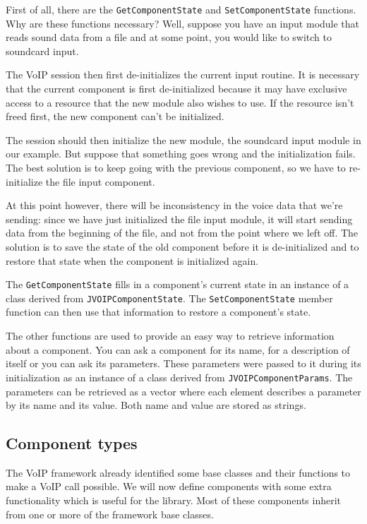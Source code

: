		First of all, there are the {\tt GetComponentState} and {\tt SetComponentState}
		functions. Why are these functions necessary? Well, suppose you have an input
		module that reads sound data from a file and at some point, you would like to switch
		to soundcard input.
		
		The VoIP session then first de-initializes the current input
		routine. It is necessary that the current component is first de-initialized because
		it may have exclusive access to a resource that the new module also wishes to use.
		If the resource isn't freed first, the new component can't be initialized.
		
		The session should then initialize the new module, the soundcard input module in
		our example. But suppose that something goes wrong and the initialization fails.
		The best solution is to keep going with the previous component, so we have to
		re-initialize the file input component.
		
		At this point however, there will be inconsistency in the voice data that we're
		sending: since we have just initialized the file input module, it will start
		sending data from the beginning of the file, and not from the point where we
		left off. The solution is to save the state of the old component before it is
		de-initialized and to restore that state when the component is initialized
		again.
		
		The {\tt GetComponentState} fills in a component's current state in an instance
		of a class derived from {\tt JVOIPComponentState}. The {\tt Set\-Com\-po\-nent\-State}
		member function can then use that information to restore a component's state.
		
		The other functions are used to provide an easy way to retrieve information
		about a component. You can ask a component for its name, for a description of
		itself or you can ask its parameters. These parameters were passed to it
		during its initialization as an instance of a class derived from
		{\tt JVOIP\-Component\-Params}. The parameters can be retrieved as a vector
		where each element describes a parameter by its name and its value. Both name
		and value are stored as strings.
		
		\subsection{Component types}
		
		The VoIP framework already identified some base classes and their functions to make
		a VoIP call possible. We will now define components with some extra functionality
		which is useful for the library. Most of these components inherit from one or
		more of the framework base classes.
		
